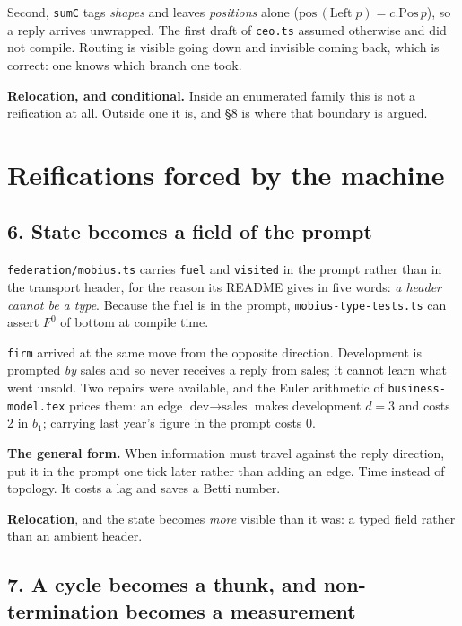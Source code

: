 \documentclass[11pt,a4paper]{article}
\begin{document}
Second, \texttt{sumC} tags \emph{shapes} and leaves \emph{positions} alone
($\mathrm{pos}\,(\mathrm{Left}\;p) = c.\mathrm{Pos}\,p$), so a reply arrives
unwrapped. The first draft of \texttt{ceo.ts} assumed otherwise and did not
compile. Routing is visible going down and invisible coming back, which is
correct: one knows which branch one took.

\textbf{Relocation, and conditional.} Inside an enumerated family this is not
a reification at all. Outside one it is, and \S8 is where that boundary is
argued.

\section{Reifications forced by the machine}

\subsection*{6. State becomes a field of the prompt}

\texttt{federation/mobius.ts} carries \texttt{fuel} and \texttt{visited} in the
prompt rather than in the transport header, for the reason its README gives in
five words: \emph{a header cannot be a type}. Because the fuel is in the
prompt, \texttt{mobius-type-tests.ts} can assert $F^0$ of bottom at compile
time.

\texttt{firm} arrived at the same move from the opposite direction. Development
is prompted \emph{by} sales and so never receives a reply from sales; it cannot
learn what went unsold. Two repairs were available, and the Euler arithmetic of
\texttt{business-model.tex} prices them: an edge $\text{dev} \to \text{sales}$
makes development $d = 3$ and costs 2 in $b_1$; carrying last year's figure in
the prompt costs 0.

\begin{sectionbox}
\textbf{The general form.} When information must travel against the reply
direction, put it in the prompt one tick later rather than adding an edge. Time
instead of topology. It costs a lag and saves a Betti number.
\end{sectionbox}

\textbf{Relocation}, and the state becomes \emph{more} visible than it was: a
typed field rather than an ambient header.

\subsection*{7. A cycle becomes a thunk, and non-termination becomes a measurement}
\end{document}
